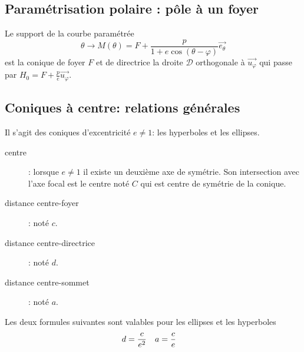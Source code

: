 \subsection{Paramétrisation polaire : pôle à un foyer}
Le support de la courbe paramétrée
\begin{displaymath}
 \theta\rightarrow M(\theta) = F + \frac{p}{1+e\cos(\theta -\varphi)}\overrightarrow{e_\theta}
\end{displaymath}
est la conique de foyer $F$ et de directrice la droite $\mathcal{D}$ orthogonale à $\overrightarrow{u_\varphi}$ qui passe par $H_0=F+\frac{p}{e}\overrightarrow{u_\varphi}$.

\subsection{Coniques à centre: relations générales}
Il s'agit des coniques d'excentricité $e\neq 1$: les hyperboles et les ellipses.
\begin{description}
 \item[centre] : lorsque $e\neq1$ il existe un deuxième axe de symétrie. Son intersection avec l'axe focal est le centre  noté $C$ qui est centre de symétrie de la conique.
\item[distance centre-foyer] : noté $c$.
\item[distance centre-directrice] : noté $d$.
\item[distance centre-sommet] : noté $a$.
\end{description}
Les deux formules suivantes sont valables pour les ellipses et les hyperboles
\begin{align}
  d&=\dfrac{c}{e^2} & a&=\dfrac{c}{e} \hfill
\end{align}

